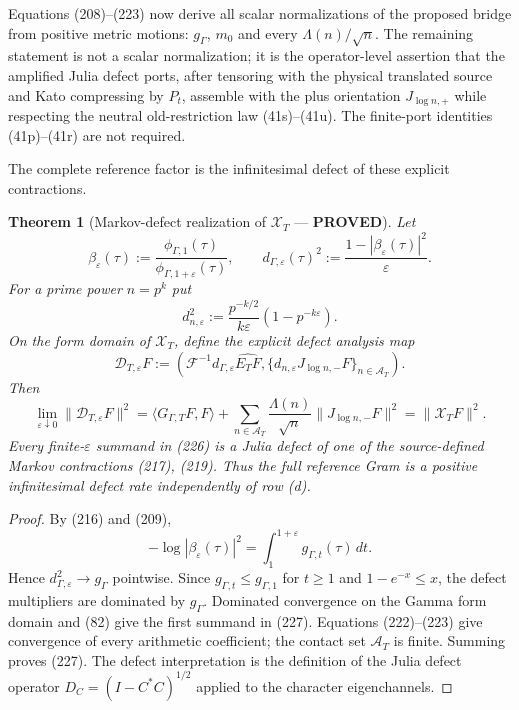 \documentclass[11pt]{article}
\newtheorem{theorem}{Theorem}
\newcommand{\PROVED}{\textcolor{green!45!black}{\textbf{PROVED}}}
\begin{document}
Equations (208)--(223) now derive all scalar normalizations of the proposed
bridge from positive metric motions: $g_\Gamma$, $m_0$ and every
$\Lambda(n)/\sqrt n$.  The remaining statement is not a scalar
normalization; it is the operator-level assertion that the amplified Julia
defect ports, after tensoring with the physical translated source and Kato
compressing by $P_t$, assemble with the plus orientation
$J_{\log n,+}$ while respecting the neutral old-restriction law
(41s)--(41u).  The finite-port identities (41p)--(41r) are not required.

The complete reference factor is the infinitesimal defect of these explicit
contractions.

\begin{theorem}[Markov-defect realization of $\mathcal X_T$ --- \PROVED]
Let
\begin{equation}
 \beta_\varepsilon(\tau):=
 \frac{\phi_{\Gamma,1}(\tau)}
      {\phi_{\Gamma,1+\varepsilon}(\tau)},
 \qquad
 d_{\Gamma,\varepsilon}(\tau)^2
 :=\frac{1-|\beta_\varepsilon(\tau)|^2}{\varepsilon}. \tag{224}
\end{equation}
For a prime power $n=p^k$ put
\begin{equation}
 d_{n,\varepsilon}^2
 :=\frac{p^{-k/2}}{k\varepsilon}
       (1-p^{-k\varepsilon}).                         \tag{225}
\end{equation}
On the form domain of $\mathcal X_T$, define the explicit defect analysis
map
\begin{equation}
 \mathcal D_{T,\varepsilon}F:=
 \left(
   \mathcal F^{-1}d_{\Gamma,\varepsilon}\widehat{E_TF},
   \{d_{n,\varepsilon}J_{\log n,-}F\}_{n\in\mathcal A_T}
 \right).                                             \tag{226}
\end{equation}
Then
\begin{equation}
 \lim_{\varepsilon\downarrow0}
 \|\mathcal D_{T,\varepsilon}F\|^2
 =\langle G_{\Gamma,T}F,F\rangle
  +\sum_{n\in\mathcal A_T}\frac{\Lambda(n)}{\sqrt n}
       \|J_{\log n,-}F\|^2
 =\|\mathcal X_TF\|^2.                               \tag{227}
\end{equation}
Every finite-$\varepsilon$ summand in (226) is a Julia defect of one of the
source-defined Markov contractions (217), (219).  Thus the full reference
Gram is a positive infinitesimal defect rate independently of row (d).
\end{theorem}

\begin{proof}
By (216) and (209),
\[
 -\log|\beta_\varepsilon(\tau)|^2
 =\int_1^{1+\varepsilon}g_{\Gamma,t}(\tau)\,dt.
\]
Hence $d_{\Gamma,\varepsilon}^2\to g_\Gamma$ pointwise.
Since $g_{\Gamma,t}\le g_{\Gamma,1}$ for $t\ge1$ and
$1-e^{-x}\le x$, the defect multipliers are dominated by $g_\Gamma$.
Dominated convergence on the Gamma form domain and (82) give the first
summand in (227).  Equations (222)--(223) give convergence of every
arithmetic coefficient; the contact set $\mathcal A_T$ is finite.  Summing
proves (227).  The defect interpretation is the definition of the Julia
defect operator $D_C=(I-C^*C)^{1/2}$ applied to the character eigenchannels.
\end{proof}
\end{document}
